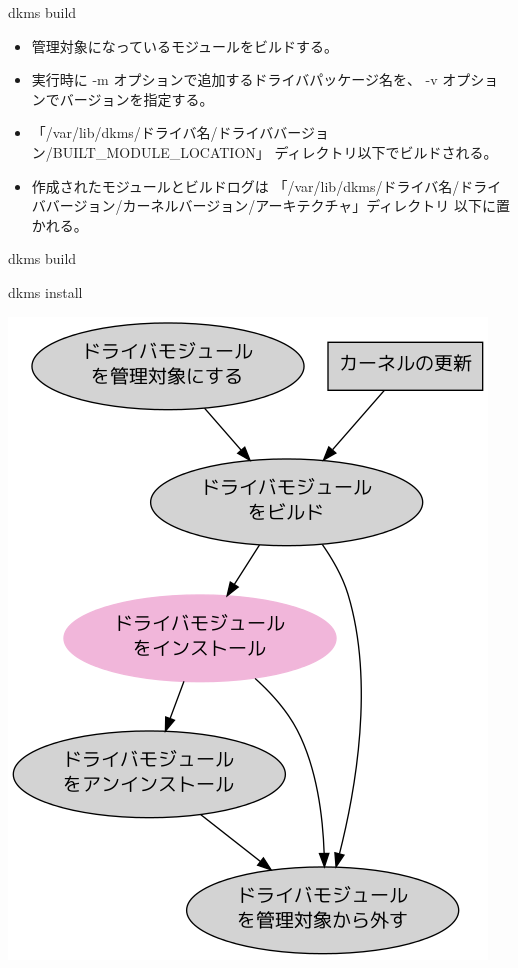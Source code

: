 \begin{frame}[containsverbatim]{dkms build}

\begin{itemize}
\item 管理対象になっているモジュールをビルドする。
\item 実行時に -m オプションで追加するドライバパッケージ名を、
-v オプションでバージョンを指定する。\\
\item 「/var/lib/dkms/ドライバ名/ドライババージョン/BUILT\_MODULE\_LOCATION」 ディレクトリ以下でビルドされる。\\
\item  作成されたモジュールとビルドログは
「/var/lib/dkms/ドライバ名/ドライババージョン/カーネルバージョン/アーキテクチャ」ディレクトリ
以下に置かれる。
\end{itemize}

\end{frame}



\begin{frame}[containsverbatim]{dkms build}


\end{frame}


\begin{frame}{dkms install}

\begin{center}
  \includegraphics[width=0.5\hsize]{image201202/dkms0-install.png}
\end{center}

\end{frame}


